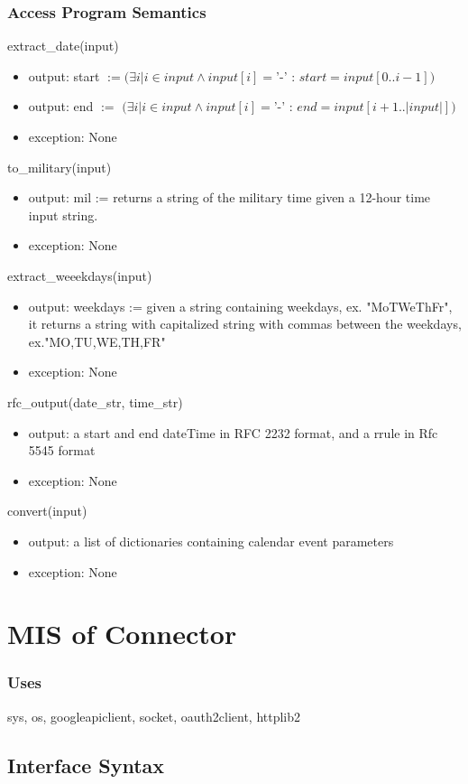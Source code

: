 \documentclass[12pt, titlepage]{article}
\begin{document}
\subsubsection{Access Program Semantics}
extract\_date(input)
\begin{itemize}
    \item output: start $:= (\exists i | i \in input \land input[i] = $'-' : $ start = input[0..i-1]) $ 
    \item output: end $:= $
    $(\exists i | i \in input \land input[i] = $'-' : $ end = input[i+1..|input|]) $
    \item exception: None
\end{itemize}
to\_military(input)
\begin{itemize}
    \item output: mil := returns a string of  the military time given a 12-hour time input string.
    \item exception: None
\end{itemize}
extract\_weeekdays(input)
\begin{itemize}
    \item output: weekdays := given a string containing weekdays, ex. "MoTWeThFr", it returns a string with capitalized string with commas between the weekdays, ex."MO,TU,WE,TH,FR" 
    \item exception: None
\end{itemize}
rfc\_output(date\_str, time\_str)
\begin{itemize}
    \item output: a start and end dateTime in RFC 2232 format, and a rrule in Rfc 5545 format
    \item exception: None
\end{itemize}
convert(input)
\begin{itemize}
    \item output: a list of dictionaries containing calendar event parameters
    \item exception: None
\end{itemize}

\section{MIS of Connector} \label{SecM3}
\subsubsection{Uses}
sys, os, googleapiclient, socket, oauth2client, httplib2
\subsection{Interface Syntax}
\end{document}
